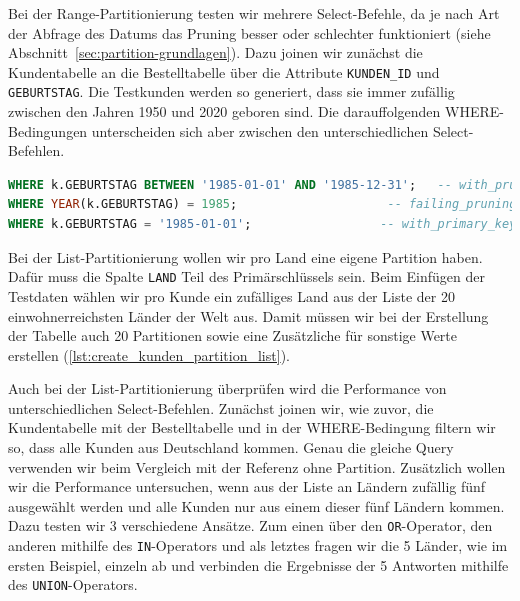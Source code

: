 \vspace{-5pt}


Bei der Range-Partitionierung testen wir mehrere Select-Befehle, da je nach Art der Abfrage des Datums das Pruning besser oder schlechter funktioniert (siehe Abschnitt~\ref{sec:partition-grundlagen}).
Dazu joinen wir zunächst die Kundentabelle an die Bestelltabelle über die Attribute \texttt{KUNDEN\_ID} und \texttt{GEBURTSTAG}.
Die Testkunden werden so generiert, dass sie immer zufällig zwischen den Jahren 1950 und 2020 geboren sind.
Die darauffolgenden WHERE-Bedingungen unterscheiden sich aber zwischen den unterschiedlichen Select-Befehlen.

\vspace{-5pt}
\begin{lstlisting}[language=SQL,caption=Unterschiedliche WHERE-Bedingungen,label={lst:different_where_conditions}]
WHERE k.GEBURTSTAG BETWEEN '1985-01-01' AND '1985-12-31'; 	-- with_pruning.sql
WHERE YEAR(k.GEBURTSTAG) = 1985;		             -- failing_pruning.sql
WHERE k.GEBURTSTAG = '1985-01-01';		            -- with_primary_key.sql
\end{lstlisting}
\vspace{-5pt}

Bei der List-Partitionierung wollen wir pro Land eine eigene Partition haben.
Dafür muss die Spalte \texttt{LAND} Teil des Primärschlüssels sein.
Beim Einfügen der Testdaten wählen wir pro Kunde ein zufälliges Land aus der Liste der 20 einwohnerreichsten Länder der Welt aus.
Damit müssen wir bei der Erstellung der Tabelle auch 20 Partitionen sowie eine Zusätzliche für sonstige Werte erstellen (\ref{lst:create_kunden_partition_list}).

\vspace{-5pt}

\vspace{-5pt}

Auch bei der List-Partitionierung überprüfen wird die Performance von unterschiedlichen Select-Befehlen.
Zunächst joinen wir, wie zuvor, die Kundentabelle mit der Bestelltabelle und in der WHERE-Bedingung filtern wir so, dass alle Kunden aus Deutschland kommen.
Genau die gleiche Query verwenden wir beim Vergleich mit der Referenz ohne Partition.
Zusätzlich wollen wir die Performance untersuchen, wenn aus der Liste an Ländern zufällig fünf ausgewählt werden und alle Kunden nur aus einem dieser fünf Ländern kommen.
Dazu testen wir 3 verschiedene Ansätze.
Zum einen über den \texttt{OR}-Operator, den anderen mithilfe des \texttt{IN}-Operators und als letztes fragen wir die 5 Länder, wie im ersten Beispiel, einzeln ab und verbinden die Ergebnisse der 5 Antworten mithilfe des \texttt{UNION}-Operators.

